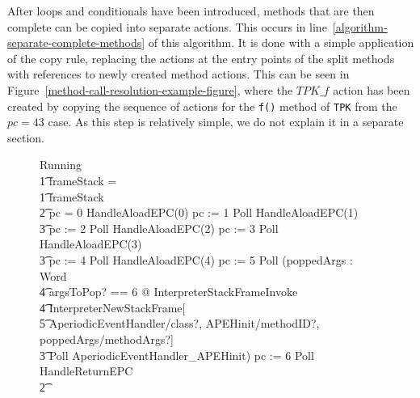 After loops and conditionals have been introduced, methods that are
then complete can be copied into separate actions.
This occurs in line~\ref{algorithm-separate-complete-methods} of this
algorithm.
It is done with a simple application of the copy rule, replacing the
actions at the entry points of the split methods with references to
newly created method actions.
This can be seen in
Figure~\ref{method-call-resolution-example-figure}, where the $TPK\_f$
action has been created by copying the sequence of actions for the
\texttt{f()} method of \texttt{TPK} from the $pc = 43$ case.
As this step is relatively simple, we do not explain it in a separate
section.
\begin{figure}[t!]
  \setlength{\zedindent}{0cm}
  \setlength{\zedtab}{0.3cm}
  \setlength{\zedleftsep}{0cm}
  \begin{circus}
    Running \circdef \\
    \t1 \circif frameStack = \emptyset \circthen \Skip \\
    \t1 {} \circelse frameStack \neq \emptyset \circthen {} \\
    \t2 {} \circif pc = 0 \circthen HandleAloadEPC(0) \circseq pc := 1 \circseq Poll \circseq HandleAloadEPC(1) \circseq \\
    \t3 pc := 2 \circseq Poll \circseq HandleAloadEPC(2) \circseq pc := 3 \circseq Poll \circseq HandleAloadEPC(3) \circseq \\
    \t3 pc := 4 \circseq Poll \circseq HandleAloadEPC(4) \circseq pc := 5 \circseq Poll \circseq (\circvar poppedArgs : \seq Word \circspot \\
    \t4 \lschexpract \exists argsToPop?  == 6 @ InterpreterStackFrameInvoke \rschexpract \circseq \\
    \t4 \lschexpract InterpreterNewStackFrame[\\
    \t5 AperiodicEventHandler/class?, APEHinit/methodID?, poppedArgs/methodArgs?] \rschexpract \circseq \\
    \t3 Poll \circseq AperiodicEventHandler\_APEHinit) \circseq pc := 6 \circseq Poll \circseq HandleReturnEPC \\
    \t2 {} \cdots {} \\

\end{circus}
\end{figure}
